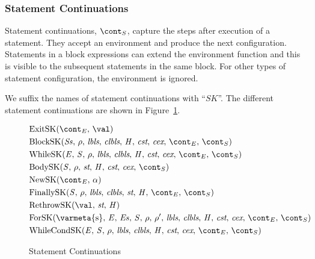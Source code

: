 \documentclass[a4paper,oneside,fleqn]{article}
\begin{document}
\subsubsection{Statement Continuations}
\label{subsubsec:statement-continuations}

Statement continuations, $\scont$, capture the steps after execution of a statement.
They accept an environment and produce the next configuration.
Statements in a block expressions can extend the environment function and this is visible to the subsequent statements in the same block.
For other types of statement configuration, the environment is ignored.

We suffix the names of statement continuations with ``$SK$''.
The different statement continuations are shown in Figure~\ref{figure:sconts}.

\newcommand{\ExitSK}[1]{\mathrm{ExitSK}(\econt,\,#1)}
\newcommand{\BlockSK}[2]{\mathrm{BlockSK}({#1},\,{#2},\,\lbls,\,\clbls,\,\handler,\,\cstrace,\,\cex,\,\econt,\,\scont)}
\newcommand{\WhileSK}{\mathrm{WhileSK}(\expr,\,\stmt,\,\env,\,\lbls,\,\clbls,\,\handler,\,\cstrace,\,\cex,\,\econt,\,\scont)}
\newcommand{\BodySK}[3]{\mathrm{BodySK}({#1},\,{#2},\,\strace,\,\handler,\,\cstrace,\,\cex,\,{#3})}
\newcommand{\NewSK}[2]{\mathrm{NewSK}({#1},\,{#2})}
\newcommand{\FinallySK}[1]{\mathrm{FinallySK}({#1},\,\env,\,\lbls,\,\clbls,\,\strace,\,\handler,\,\econt,\,\scont)}
\newcommand{\RethrowSK}[3]{\mathrm{RethrowSK}({#1},\,{#2},\,{#3})}
\newcommand{\ForSK}{\mathrm{ForSK}(\mathrm{\varmeta{s}},\, \expressionmeta,\, \exprs,\, \statementmeta,\, \env,\, \env',\, \lbls,\, \clbls,\, \handler,\, \cstrace,\, \cex,\, \econt,\, \scont)}
\newcommand{\WhileCondSK}{\mathrm{WhileCondSK}(\expr,\,\stmt,\,\env,\,\lbls,\,\clbls,\,\handler,\,\cstrace,\,\cex,\,\econt,\,\scont)}
\begin{figure}[Htp]
  \begin{eqfigure}
  \begin{align}
    &\ExitSK{\val} \label{scont:exit}\\
    &\BlockSK{\stmts}{\env} \label{scont:block}\\
    &\WhileSK \label{scont:while}\\
    &\BodySK{\stmt}{\env}{\scont} \label{scont:body}\\
    &\NewSK{\econt}{\loc} \label{scont:new}\\
    &\FinallySK{\stmt} \label{scont:finally}\\
    &\RethrowSK{\val}{\strace}{\handler} \label{scont:rethrow}\\
    &\ForSK \label{scont:for}\\
    &\WhileCondSK \label{scont:while}
  \end{align}
  \caption{Statement Continuations}
  \label{figure:sconts}
  \end{eqfigure}
\end{figure}
\end{document}
